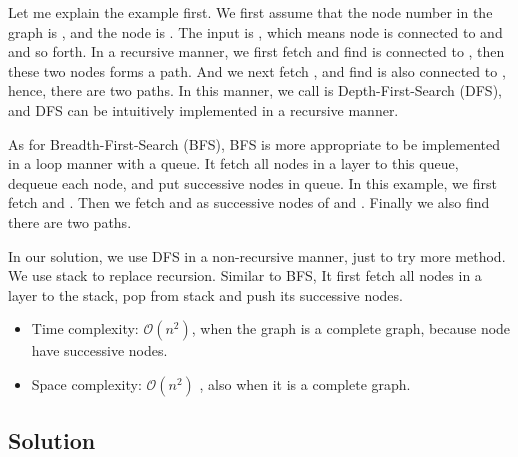 Let me explain the example first. We first assume that the node number in the graph is , and the node is . The input is \inlinecode{[[1, 2], [3], [3], []]}, which means node  is connected to  and  and so forth. In a recursive manner, we first fetch  and find  is connected to , then these two nodes forms a path. And we next fetch , and find  is also connected to , hence, there are two paths. In this manner, we call is Depth-First-Search (DFS), and DFS can be intuitively implemented in a recursive manner.

As for Breadth-First-Search (BFS), BFS is more appropriate to be implemented in a loop manner with a queue. It fetch all nodes in a layer to this queue, dequeue each node, and put successive nodes in queue. In this example, we first fetch  and . Then we fetch  and  as successive nodes of  and . Finally we also find there are two paths.

In our solution, we use DFS in a non-recursive manner, just to try more method. We use stack to replace recursion. Similar to BFS, It first fetch all nodes in a layer to the stack, pop from stack and push its successive nodes.
\begin{itemize}
    \item Time complexity: $\mathcal{O}(n^2)$, when the graph is a complete graph, because node  have  successive nodes.
    \item Space complexity: $\mathcal{O}(n^2)$ , also when it is a complete graph.
\end{itemize}

\subsection*{Solution}

